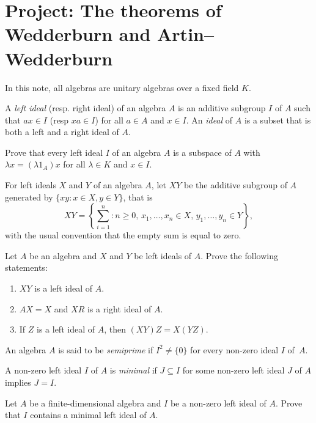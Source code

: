 \section{Project: The theorems of Wedderburn and Artin--Wedderburn}

In this note, all algebras are unitary algebras over a fixed field $K$. 

A \emph{left ideal} (resp. right ideal) 
of an algebra
$A$ is an additive subgroup $I$ of $A$ such that 
$ax\in I$ (resp $xa\in I$) 
for all $a\in A$ and $x\in I$. An \emph{ideal} of $A$ 
is a subset that is both a left and a right ideal of $A$. 

\begin{exercise}
Prove that every left ideal $I$ of an algebra 
$A$ is a subspace of $A$ with $\lambda x=(\lambda 1_A)x$ 
for all $\lambda\in K$ and $x\in I$.
\end{exercise}

For left ideals $X$ and $Y$ of 
an algebra $A$, let $XY$ be the additive subgroup of $A$ 
generated by $\{xy:x\in X,y\in Y\}$, that is 
\[
XY=\left\{\sum_{i=1}^n:n\geq0,\,x_1,\dots,x_n\in X,\,y_1,\dots,y_n\in Y\right\},
\]
with the usual convention that the empty sum is equal to zero. 
    
\begin{exercise}
    Let $A$ be an algebra and $X$ and $Y$ be left ideals of $A$. 
    Prove the following statements:
    \begin{enumerate}
        \item $XY$ is a left ideal of $A$.
        \item $AX=X$ and $XR$ is a right ideal of $A$. 
        \item If $Z$ is a left ideal of $A$, then $(XY)Z=X(YZ)$. 
    \end{enumerate}
\end{exercise}

\begin{definition}
An algebra $A$ is said to be 
\emph{semiprime} if $I^2\ne\{0\}$ for every non-zero ideal $I$ of~$A$.	
\end{definition}

\begin{definition}
A non-zero left ideal $I$ of $A$ is \emph{minimal} if 
$J\subseteq I$ for some non-zero 
left ideal $J$ of $A$ implies $J=I$. 
\end{definition}

\begin{exercise}
\label{xca:minimal}
    Let $A$ be a finite-dimensional algebra and $I$ be a non-zero left
    ideal of $A$. Prove that $I$ contains a minimal left ideal of $A$. 
\end{exercise}

